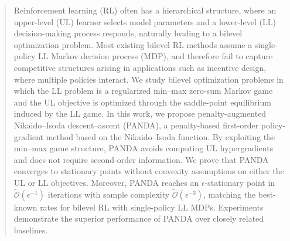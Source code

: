 \documentclass{article}
\theoremstyle{plain}
\theoremstyle{definition}
\theoremstyle{remark}
\begin{document}

\printAffiliationsAndNotice{}  %

\begin{abstract}
Reinforcement learning (RL) often has a hierarchical structure, where an upper-level (UL) learner selects model parameters and a lower-level (LL) decision-making process responds, naturally leading to a bilevel optimization problem. Most existing bilevel RL methods assume a single-policy LL Markov decision process (MDP), and therefore fail to capture competitive structures arising in applications such as incentive design, where multiple policies interact. We study bilevel optimization problems in which the LL problem is a regularized min–max zero-sum Markov game and the UL objective is optimized through the saddle-point equilibrium induced by the LL game. In this work, we propose penalty-augmented Nikaido–Isoda descent–ascent (PANDA), a penalty-based first-order policy-gradient method based on the Nikaido–Isoda function. By exploiting the min–max game structure, PANDA avoids computing UL hypergradients and does not require second-order information. We prove that PANDA converges to stationary points without convexity assumptions on either the UL or LL objectives. Moreover, PANDA reaches an $\epsilon$-stationary point in $\tilde{\mathcal{O}}(\epsilon^{-1})$ iterations with sample complexity $\tilde{\mathcal{O}}(\epsilon^{-3})$, matching the best-known rates for bilevel RL with single-policy LL MDPs. Experiments demonstrate the superior performance of PANDA over closely related baselines.
\end{abstract}
\end{document}
